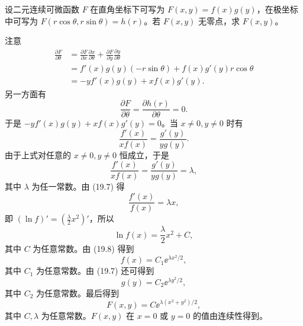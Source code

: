\begin{xexample}[19.3.5]
设二元连续可微函数 $F$ 在直角坐标下可写为 $F(x,y)=f(x)g(y)$，在极坐标中可写为 $F(r\cos\theta,r\sin\theta)=h(r)$。若 $F(x,y)$ 无零点，求 $F(x,y)$。
\end{xexample}
\begin{xsolution}
注意
\begin{align*}
  \frac{\partial F}{\partial\theta}
  &=\frac{\partial F}{\partial x}\frac{\partial x}{\partial\theta}
    +\frac{\partial F}{\partial y}\frac{\partial y}{\partial\theta}\\
  &=f'(x)g(y)(-r\sin\theta)+f(x)g'(y)r\cos\theta\\
  &=-yf'(x)g(y)+xf(x)g'(y).
\end{align*}
另一方面有
\[
  \frac{\partial F}{\partial\theta}=\frac{\partial h(r)}{\partial\theta}=0.
\]
于是 $-yf'(x)g(y)+xf(x)g'(y)=0$。当 $x\ne0,y\ne0$ 时有
\begin{equation}
  \frac{f'(x)}{xf(x)}=\frac{g'(y)}{yg(y)}.
  \tag{19.6}
  \label{eq:19.6}
\end{equation}
由于上式对任意的 $x\ne0,y\ne0$ 恒成立，于是
\begin{equation}
  \frac{f'(x)}{xf(x)}=\frac{g'(y)}{yg(y)}=\lambda,
  \tag{19.7}
  \label{eq:19.7}
\end{equation}
其中 $\lambda$ 为任一常数。由 (19.7) 得
\[
  \frac{f'(x)}{f(x)}=\lambda x,
\]
即 $(\ln f)'=\left(\frac\lambda2x^2\right)'$，所以
\begin{equation}
  \ln f(x)=\frac\lambda2x^2+C,
  \tag{19.8}
  \label{eq:19.8}
\end{equation}
其中 $C$ 为任意常数。由 (19.8) 得到
\[
  f(x)=C_1\ee^{\lambda x^2/2},
\]
其中 $C_1$ 为任意常数。由 (19.7) 还可得到
\[
  g(y)=C_2\ee^{\lambda y^2/2},
\]
其中 $C_2$ 为任意常数。最后得到
\[
  F(x,y)=C\ee^{\lambda(x^2+y^2)/2},
\]
其中 $C,\lambda$ 为任意常数。$F(x,y)$ 在 $x=0$ 或 $y=0$ 的值由连续性得到。
\end{xsolution}


